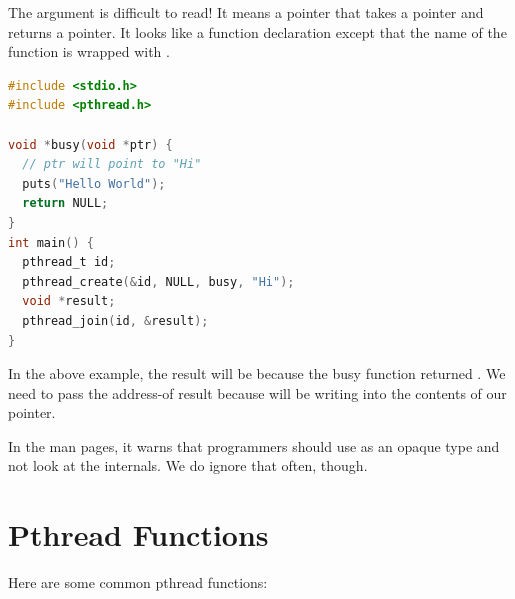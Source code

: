 The argument  is difficult to read!
It means a pointer that takes a  pointer and returns a  pointer.
It looks like a function declaration except that the name of the function is wrapped with .

\begin{lstlisting}[language=C]
#include <stdio.h>
#include <pthread.h>

void *busy(void *ptr) {
  // ptr will point to "Hi"
  puts("Hello World");
  return NULL;
}
int main() {
  pthread_t id;
  pthread_create(&id, NULL, busy, "Hi");
  void *result;
  pthread_join(id, &result);
}
\end{lstlisting}

In the above example, the result will be  because the busy function returned .
We need to pass the address-of result because  will be writing into the contents of our pointer.

In the man pages, it warns that programmers should use  as an opaque type and not look at the internals.
We do ignore that often, though.

\section{Pthread Functions}

Here are some common pthread functions:

